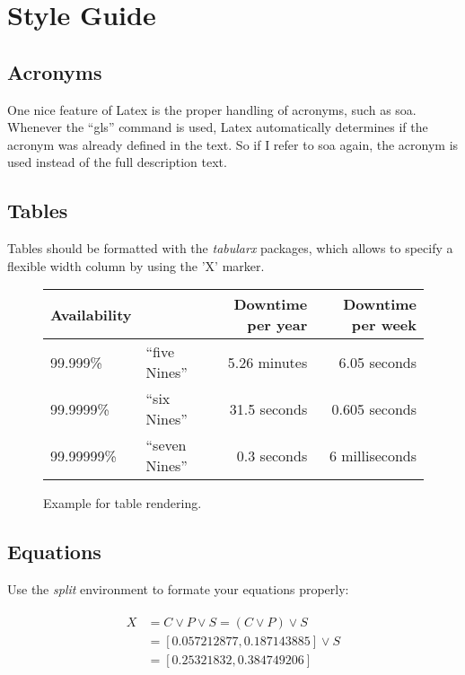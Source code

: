 \documentclass[12pt,a4paper,oneside]{article}
\newcommand{\enquote}[1]{``#1''}
\begin{document}
\section*{Style Guide}

\subsection*{Acronyms}

One nice feature of Latex is the proper handling of acronyms, such as \gls{soa}. Whenever the \enquote{gls} command is used, Latex automatically determines if the acronym was already defined in the text. So if I refer to \gls{soa} again, the acronym is used instead of the full description text.

\subsection*{Tables}
\label{sec:tableExamples}

Tables should be formatted with the \emph{tabularx} packages, which allows to specify a flexible width column by using the 'X' marker.

\begin{figure}[ht]
\begin{tabularx}{\textwidth}{lXrr}
\toprule
Availability & & Downtime per year & Downtime per week\\
\midrule
99.999\%   & \enquote{five Nines}  & 5.26 minutes & 6.05 seconds \\
99.9999\%  & \enquote{six Nines}  & 31.5 seconds & 0.605 seconds \\
99.99999\% & \enquote{seven Nines} & 0.3 seconds & 6 milliseconds \\
\bottomrule
\end{tabularx}
\label{tab:availpercent}
\caption{Example for table rendering.}
\end{figure}

\subsection*{Equations}

Use the \emph{split} environment to formate your equations properly:

\begin{align}
  \begin{split}
    X &= C \lor P \lor S = (C \lor P) \lor S \\
      &= [0.057212877, 0.187143885] \lor S \\
      &= [0.25321832, 0.384749206]
  \end{split}
\end{align}  
\end{document}
